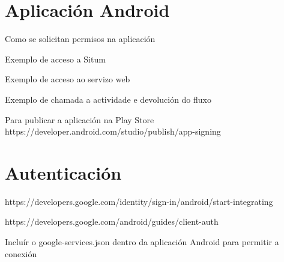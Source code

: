 \section{Aplicación Android}

Como se solicitan permisos na aplicación

Exemplo de acceso a Situm

Exemplo de acceso ao servizo web

Exemplo de chamada a actividade e devolución do fluxo

Para publicar a aplicación na Play Store
https://developer.android.com/studio/publish/app-signing




\section{Autenticación}

https://developers.google.com/identity/sign-in/android/start-integrating


https://developers.google.com/android/guides/client-auth


Incluír o google-services.json dentro da aplicación Android para permitir a conexión